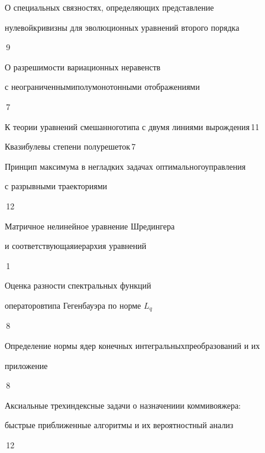 {О специальных связностях, определяющих представление 


нулевой\newline кривизны для эволюционных уравнений второго порядка}{\No\,9}




{О разрешимости вариационных неравенств 


с неограниченными\newline полумонотонными отображениями}{\No\,7}




{К теории уравнений смешанного\newline типа с двумя линиями вырождения}{\No\,11}




{Квазибулевы степени полурешеток}{\No\,7}






{Принцип максимума в негладких задачах оптимального\newline управления


с разрывными траекториями}{\No\,12}




{Матричное нелинейное уравнение Шредингера 


и соответствующая\newline иерархия уравнений}{\No\,1}




{Оценка разности спектральных функций 


операторов\newline типа Гегенбауэра по норме $L_q$}{\No\,8}




{Определение нормы ядер конечных интегральных\newline преобразований и их 


приложение}{\No\,8}




{Аксиальные трехиндексные задачи о назначении\newline и коммивояжера:


быстрые приближенные алгоритмы и их вероятностный анализ}{\No\,12}




